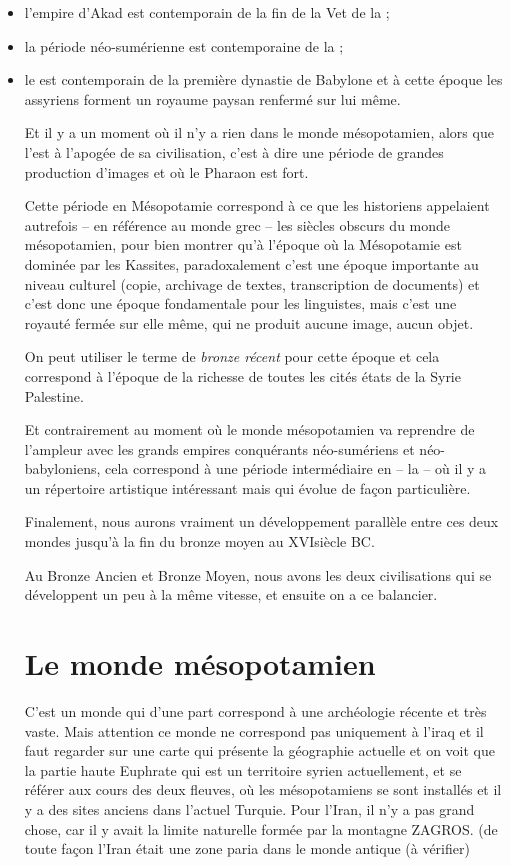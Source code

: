 \documentclass[a4paper,10pt]{article}
\begin{document}
\begin{itemize}
  \item l'empire d'Akad est contemporain de la fin de la V\ieme et de 
        la  ;
  \item la période néo-sumérienne est contemporaine de la \PPI ;
  \item le \MK est contemporain de la première dynastie de Babylone 
        et à cette époque les assyriens forment un royaume paysan 
        renfermé sur lui même.

Et il y a un moment où il n'y a rien dans le monde mésopotamien, 
alors que l'\kmt est à l'apogée de sa civilisation, c'est à dire une 
période de grandes production d'images et où le Pharaon est fort.

Cette période en Mésopotamie correspond à ce que les historiens 
appelaient autrefois -- en référence au monde grec -- \og les siècles 
obscurs \fg du monde mésopotamien, pour bien montrer qu'à l'époque où 
la Mésopotamie est dominée par les Kassites, paradoxalement c'est une 
époque importante au niveau culturel (copie, archivage de textes, 
transcription de documents) et c'est donc une époque fondamentale pour 
les linguistes, mais c'est une royauté fermée sur elle même, qui ne 
produit aucune image, aucun objet.

On peut utiliser le terme de \emph{bronze récent} pour cette époque et 
cela correspond à l'époque de la richesse de toutes les cités états de 
la Syrie Palestine.

Et contrairement au moment où le monde mésopotamien va reprendre de 
l'ampleur avec les grands empires conquérants néo-sumériens et 
néo-babyloniens, cela correspond à une période intermédiaire en \kmt 
-- la \LP --  où il y a un répertoire artistique intéressant mais qui 
évolue de façon particulière.

Finalement, nous aurons vraiment un développement parallèle entre ces 
deux mondes jusqu'à la fin du bronze moyen au XVI\ieme siècle BC.

Au Bronze Ancien et Bronze Moyen, nous avons les deux civilisations 
qui se développent un peu à la même vitesse, et ensuite on a ce 
balancier.

\section{Le monde mésopotamien}

C'est un monde qui d'une part
correspond à une archéologie récente et très vaste. Mais attention ce
monde ne correspond pas uniquement à l'iraq et il faut
regarder sur une carte qui présente la géographie actuelle et on voit
que la partie haute Euphrate qui est un territoire syrien actuellement,
et se référer aux cours des deux fleuves, où les mésopotamiens se sont
installés  et il y a des sites anciens dans l'actuel
Turquie. Pour l'Iran, il n'y  a pas
grand chose, car il y avait la limite naturelle formée par la montagne 
ZAGROS. (de toute façon l'Iran était une zone paria
dans le monde antique (à vérifier)


\end{itemize}
\end{document}
